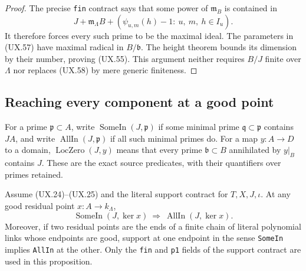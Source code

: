 \begin{proof}
The precise \texttt{fin} contract says
that some power of $\mathfrak m_B$
is contained in
\[
 J+\mathfrak m_\Lambda B+
   (\psi_{u,m}(h)-1:\ u,\ m,\ h\in I_u).
 \tag{UX.58}
\]
It therefore forces every such prime
to be the maximal ideal.  The parameters
in (UX.57) have maximal radical in
$B/\mathfrak b$.  The height theorem
bounds its dimension by their number,
proving (UX.55).  This argument neither
requires $B/J$ finite over $\Lambda$
nor replaces (UX.58) by mere generic
finiteness.
\end{proof}

\subsection{Reaching every component at a good point}

For a prime $\mathfrak p\subset A$, write
$\operatorname{SomeIn}(J,\mathfrak p)$ if some
minimal prime $\mathfrak q\subset\mathfrak p$
contains $JA$, and write
$\operatorname{AllIn}(J,\mathfrak p)$ if all
such minimal primes do.  For a map $y:A\to D$
to a domain, $\operatorname{LocZero}(J,y)$
means that every prime $\mathfrak b\subset B$
annihilated by $y|_B$ contains $J$.  These are
the exact source predicates, with their
quantifiers over primes retained.

\begin{proposition}
Assume (UX.24)--(UX.25) and the literal support
contract for $T,X,J,\iota$.
At any good residual point $x:A\to k_\Lambda$,
\[
 \operatorname{SomeIn}(J,\ker x)
       \ \Longrightarrow\
 \operatorname{AllIn}(J,\ker x).
 \tag{UX.59}
\]
Moreover, if two residual points are the ends
of a finite chain of literal polynomial links
whose endpoints are good, support at one
endpoint in the sense \texttt{SomeIn} implies
\texttt{AllIn} at the other.  Only the
\texttt{fin} and \texttt{p1} fields of the
support contract are used in this proposition.
\end{proposition}

